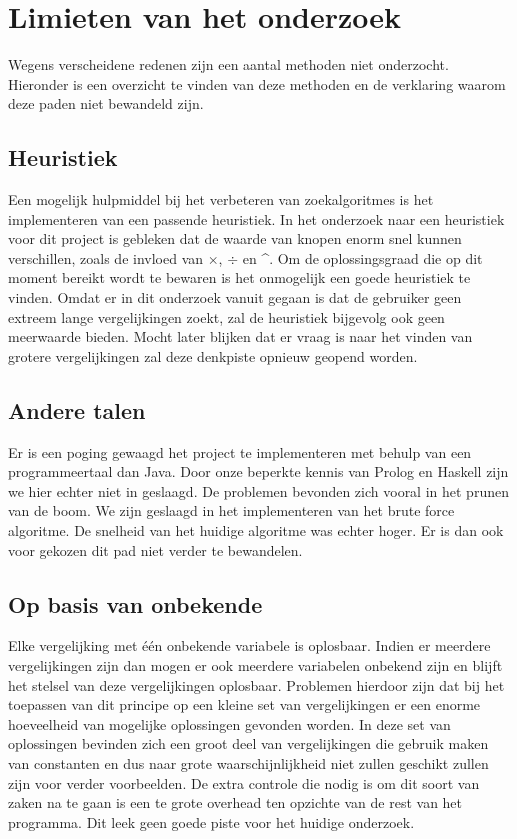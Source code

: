 \documentclass[Main.tex]{subfiles}
\begin{document}
\section{Limieten van het onderzoek}
Wegens verscheidene redenen zijn een aantal methoden niet onderzocht. Hieronder is een overzicht te vinden van deze methoden en de verklaring waarom deze paden niet bewandeld zijn. 

\subsection{Heuristiek}
Een mogelijk hulpmiddel bij het verbeteren van zoekalgoritmes is het implementeren van een passende heuristiek. In het onderzoek naar een heuristiek voor dit project is gebleken dat de waarde van knopen enorm snel kunnen verschillen, zoals de invloed van $\times$, $\div$ en \^{}. Om de oplossingsgraad die op dit moment bereikt wordt te bewaren is het onmogelijk een goede heuristiek te vinden. Omdat er in dit onderzoek vanuit gegaan is dat de gebruiker geen extreem lange vergelijkingen zoekt, zal de heuristiek bijgevolg ook geen meerwaarde bieden. Mocht later blijken dat er vraag is naar het vinden van grotere vergelijkingen zal deze denkpiste opnieuw geopend worden.

\subsection{Andere talen}
Er is een poging gewaagd het project te implementeren met behulp van een programmeertaal dan Java. Door onze beperkte kennis van Prolog en Haskell zijn we hier echter niet in geslaagd. De problemen bevonden zich vooral in het prunen van de boom. We zijn geslaagd in het implementeren van het brute force algoritme. De snelheid van het huidige algoritme was echter hoger. Er is dan ook voor gekozen dit pad niet verder te bewandelen.

\subsection{Op basis van onbekende}
Elke vergelijking met \'e\'en onbekende variabele is oplosbaar. Indien er meerdere vergelijkingen zijn dan mogen er ook meerdere variabelen onbekend zijn en blijft het stelsel van deze vergelijkingen oplosbaar. Problemen hierdoor zijn dat bij het toepassen van dit principe op een kleine set van vergelijkingen er een enorme hoeveelheid van mogelijke oplossingen gevonden worden. In deze set van oplossingen bevinden zich een groot deel van vergelijkingen die gebruik maken van constanten en dus naar grote waarschijnlijkheid niet zullen geschikt zullen zijn voor verder voorbeelden. De extra controle die nodig is om dit soort van zaken na te gaan is een te grote overhead ten opzichte van de rest van het programma. Dit leek geen goede piste voor het huidige onderzoek.
\end{document}
